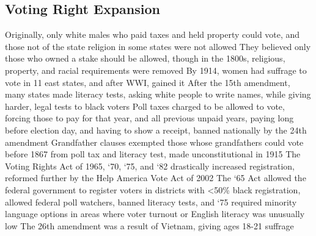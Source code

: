 \documentclass[11 pt, twoside]{article}
\newenvironment{outline*}
{
	\begin{outline}[enumerate]
	}
	{\end{outline}
}
\begin{document}
\subsection{Voting Right Expansion}
\begin{outline*}
\1 Originally, only white males who paid taxes and held property could vote, and those not of the state religion in some states were not allowed
\2 They believed only those who owned a stake should be allowed, though in the 1800s, religious, property, and racial requirements were removed
\1 By 1914, women had suffrage to vote in 11 east states, and after WWI, gained it
\1 After the 15th amendment, many states made literacy tests, asking white people to write names, while giving harder, legal tests to black voters
\2 Poll taxes charged to be allowed to vote, forcing those to pay for that year, and all previous unpaid years, paying long before election day, and having to show a receipt, banned nationally by the 24th amendment
\2 Grandfather clauses exempted those whose grandfathers could vote before 1867 from poll tax and literacy test, made unconstitutional in 1915
\2 The Voting Rights Act of 1965, ‘70, ‘75, and ‘82 drastically increased registration, reformed further by the Help America Vote Act of 2002
\2 The ‘65 Act allowed the federal government to register voters in districts with <50\% black registration, allowed federal poll watchers, banned literacy tests, and ‘75 required minority language options in areas where voter turnout or English literacy was unusually low
\1 The 26th amendment was a result of Vietnam, giving ages 18-21 suffrage
\end{outline*}
\end{document}
